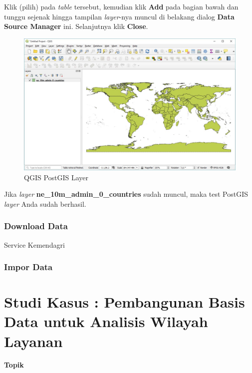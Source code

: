 \documentclass[]{book}
\begin{document}
\begin{itemize}
  Klik (pilih) pada \emph{table} tersebut, kemudian klik \textbf{Add} pada bagian bawah dan tunggu sejenak hingga tampilan \emph{layer}-nya muncul di belakang dialog \textbf{Data Source Manager} ini. Selanjutnya klik \textbf{Close}.

  \begin{figure}
  \centering
  \includegraphics{./img/qgis-postgis-layer-loaded.jpg}
  \caption{QGIS PostGIS Layer}
  \end{figure}

  Jika \emph{layer} \textbf{ne\_10m\_admin\_0\_countries} sudah muncul, maka test PostGIS \emph{layer} Anda sudah berhasil.
\end{itemize}

\hypertarget{download-data}{%
\subsection{Download Data}\label{download-data}}

Service Kemendagri

\hypertarget{impor-data}{%
\subsection{Impor Data}\label{impor-data}}

\hypertarget{studi-kasus-pembangunan-basis-data-untuk-analisis-wilayah-layanan}{%
\chapter{Studi Kasus : Pembangunan Basis Data untuk Analisis Wilayah Layanan}\label{studi-kasus-pembangunan-basis-data-untuk-analisis-wilayah-layanan}}

\textbf{Topik}
\end{document}
